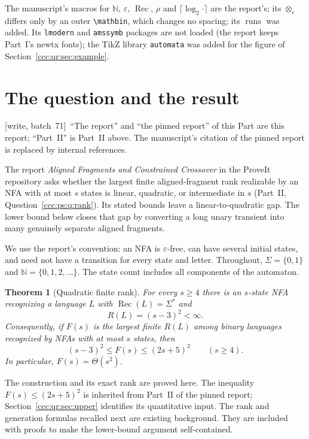 \documentclass[11pt,letterpaper]{article}
\newtheorem{theorem}{Theorem}[section]
\theoremstyle{definition}
\theoremstyle{remark}
\newcommand{\N}{\mathbb N}
\newcommand{\eps}{\varepsilon}
\newcommand{\rec}{\operatorname{Rec}}
\newcommand{\cut}{\otimes_{\mathrm c}}
\newcommand{\rank}{\rho}
\newcommand{\wsevone}{\textup{[write, batch~71]}}
\newcommand{\runs}{\operatorname{runs}}
\begin{document}
The manuscript's macros for $\N$, $\eps$, $\rec$, $\rank$ and $\lceil\log_2\cdot\rceil$
are the report's; its $\cut$ differs only by an outer \verb|\mathbin|, which
changes no spacing; its $\runs$ was added. Its \texttt{lmodern} and
\texttt{amssymb} packages are not loaded (the report keeps Part~I's newtx
fonts); the TikZ library \texttt{automata} was added for the figure of
Section~\ref{ccc:qr:sec:example}.

\section{The question and the result}\label{ccc:qr:sec:intro}

\wsevone\ ``The report'' and ``the pinned report'' of this Part are this
report; ``Part~II'' is Part~II above. The manuscript's citation of the pinned
report is replaced by internal references.

The report \emph{Aligned Fragments and Constrained Crossover} in the ProveIt
repository asks whether the largest finite aligned-fragment rank realizable
by an NFA with at most $s$ states is linear, quadratic, or intermediate in
$s$ (Part~II, Question~\ref{ccc:ps:q:rank}). Its stated bounds leave a
linear-to-quadratic gap. The lower bound below closes that gap by converting
a long unary transient into many genuinely separate aligned fragments.

We use the report's convention: an NFA is $\eps$-free, can have several
initial states, and need not have a transition for every state and letter.
Throughout, $\Sigma=\{0,1\}$ and $\N=\{0,1,2,\ldots\}$. The state count
includes all components of the automaton.

\begin{theorem}[Quadratic finite rank]\label{ccc:qr:thm:main}
For every $s\ge4$ there is an $s$-state NFA recognizing a language $L$ with
$\rec(L)=\Sigma^*$ and
\[
R(L)=(s-3)^2<\infty.
\]
Consequently, if $F(s)$ is the largest finite $R(L)$ among binary languages
recognized by NFAs with at most $s$ states, then
\[
(s-3)^2\le F(s)\le(2s+5)^2\qquad(s\ge4).
\]
In particular, $F(s)=\Theta(s^2)$.
\end{theorem}

The construction and its exact rank are proved here. The inequality
$F(s)\le(2s+5)^2$ is inherited from Part~II of the pinned report;
Section~\ref{ccc:qr:sec:upper} identifies its quantitative input. The rank
and generation formulas recalled next are existing background. They are
included with proofs to make the lower-bound argument self-contained.
\end{document}
